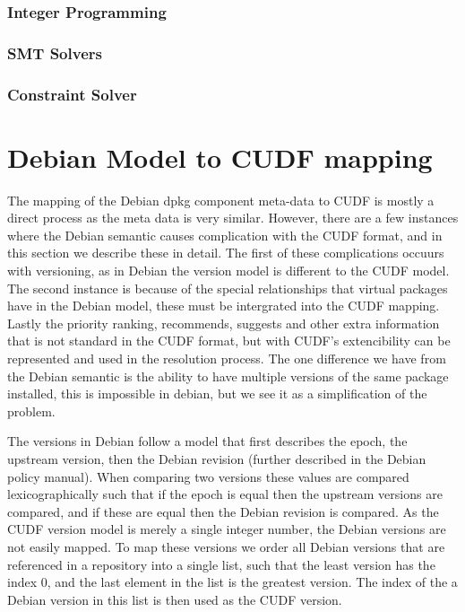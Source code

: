 \subsubsection{Integer Programming}
\subsubsection{SMT Solvers}
\subsubsection{Constraint Solver}


\section{Debian Model to CUDF mapping}
\label{DebToCUDF}
The mapping of the Debian dpkg component meta-data to CUDF is mostly a direct process as the meta data is very similar. 
However, there are a few instances where the Debian semantic causes complication with the CUDF format, and in this section we describe these in detail.
The first of these complications occuurs with versioning, as in Debian the version model is different to the CUDF model.
The second instance is because of the special relationships that virtual packages have in the Debian model, 
these must be intergrated into the CUDF mapping. 
Lastly the priority ranking, recommends, suggests and other extra information that is not standard in the CUDF format,
but with CUDF's extencibility can be represented and used in the resolution process.
The one difference we have from the Debian semantic is the ability to have multiple versions of the same package installed, this is impossible in debian, but we see it as a simplification of the problem.

The versions in Debian follow a model that first describes the epoch,
the upstream version, then the Debian revision (further described in the Debian policy manual). %
When comparing two versions these values are compared lexicographically such that
if the epoch is equal then the upstream versions are compared, 
and if these are equal then the Debian revision is compared.
As the CUDF version model is merely a single integer number, 
the Debian versions are not easily mapped.
To map these versions we order all Debian versions that are referenced in a repository into a single list, 
such that the least version has the index 0, and the last element in the list is the greatest version.
The index of the a Debian version in this list is then used as the CUDF version.

